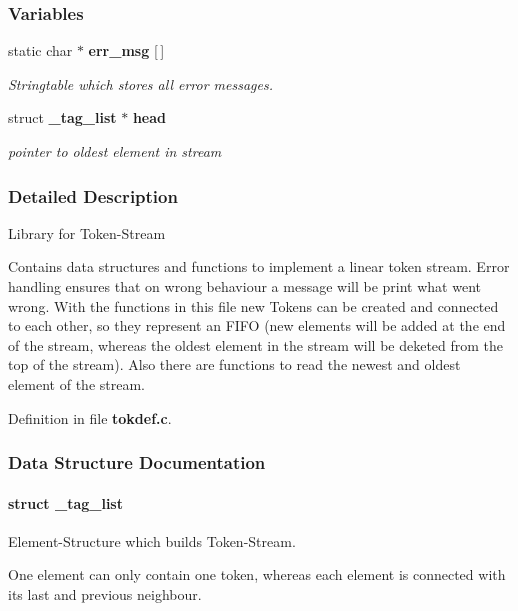 \subsubsection*{\-Variables}
\begin{DoxyCompactItemize}
\item 
static char $\ast$ {\bf err\-\_\-msg} [$\,$]
\begin{DoxyCompactList}\small\item\em \-Stringtable which stores all error messages. \end{DoxyCompactList}\item 
struct {\bf \-\_\-tag\-\_\-list} $\ast$ {\bf head}
\begin{DoxyCompactList}\small\item\em pointer to oldest element in stream \end{DoxyCompactList}\end{DoxyCompactItemize}


\subsubsection{\-Detailed \-Description}
\-Library for \-Token-\/\-Stream

\-Contains data structures and functions to implement a linear token stream. \-Error handling ensures that on wrong behaviour a message will be print what went wrong. \-With the functions in this file new \-Tokens can be created and connected to each other, so they represent an \-F\-I\-F\-O (new elements will be added at the end of the stream, whereas the oldest element in the stream will be deketed from the top of the stream). \-Also there are functions to read the newest and oldest element of the stream. 

\-Definition in file {\bf tokdef.\-c}.



\subsubsection{\-Data \-Structure \-Documentation}
\label{struct__tag__list}
\paragraph{struct \-\_\-tag\-\_\-list}
\-Element-\/\-Structure which builds \-Token-\/\-Stream. 

\-One element can only contain one token, whereas each element is connected with its last and previous neighbour. 

